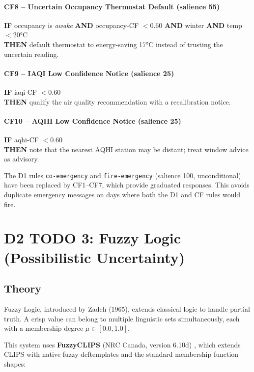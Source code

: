 \documentclass{article}
\begin{document}
\paragraph{CF8 -- Uncertain Occupancy Thermostat Default (salience 55)}
\textbf{IF} occupancy is \emph{awake} \textbf{AND} occupancy-CF $< 0.60$ \textbf{AND} winter \textbf{AND} temp $< 20$°C \\
\textbf{THEN} default thermostat to energy-saving 17°C instead of trusting the uncertain reading.

\paragraph{CF9 -- IAQI Low Confidence Notice (salience 25)}
\textbf{IF} iaqi-CF $< 0.60$ \\
\textbf{THEN} qualify the air quality recommendation with a recalibration notice.

\paragraph{CF10 -- AQHI Low Confidence Notice (salience 25)}
\textbf{IF} aqhi-CF $< 0.60$ \\
\textbf{THEN} note that the nearest AQHI station may be distant; treat window advice as advisory.

The D1 rules \texttt{co-emergency} and \texttt{fire-emergency} (salience 100, unconditional) have been replaced by CF1--CF7, which provide graduated responses. This avoids duplicate emergency messages on days where both the D1 and CF rules would fire.



\section{D2 TODO 3: Fuzzy Logic (Possibilistic Uncertainty)}

\subsection{Theory}

Fuzzy Logic, introduced by Zadeh (1965), extends classical logic to handle partial truth. A crisp value can belong to multiple linguistic sets simultaneously, each with a membership degree $\mu \in [0.0, 1.0]$.

This system uses \textbf{FuzzyCLIPS} (NRC Canada, version 6.10d) \cite{fuzzyclips}, which extends CLIPS with native fuzzy deftemplates and the standard membership function shapes:
\end{document}
